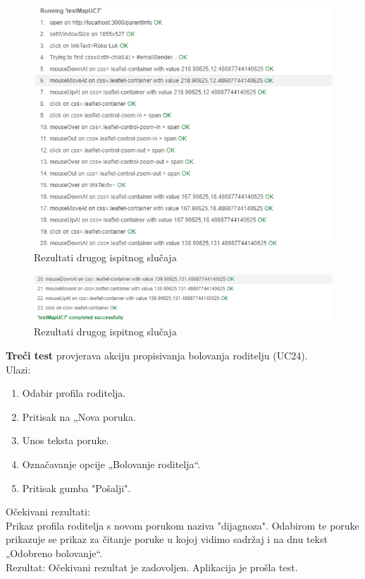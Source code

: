 		\begin{figure}[H]
			\includegraphics[width=\textwidth]{slike/pregledNaručivanja.PNG} %
			\caption{Rezultati drugog ispitnog slučaja}
			\label{fig:pregledKarteTest} %
		\end{figure}
		\begin{figure}[H]
			\includegraphics[width=\textwidth]{slike/pregledNaručivanja2.PNG} %
			\caption{Rezultati drugog ispitnog slučaja}
			\label{fig:pregledKarteTest2} %
		\end{figure}
		
		
		\noindent \textbf{Treći test} provjerava akciju propisivanja bolovanja roditelju (UC24).\\
		Ulazi:
		\begin{enumerate}
			\item Odabir profila roditelja.
			\item Pritisak na „Nova poruka.
			\item Unos teksta poruke.
			\item Označavanje opcije „Bolovanje roditelja“.
			\item Pritisak gumba "Pošalji".
		\end{enumerate}
		Očekivani rezultati:\\Prikaz profila roditelja s novom porukom naziva "dijagnoza". Odabirom te poruke prikazuje se prikaz za čitanje poruke u kojoj vidimo sadržaj i na dnu tekst „Odobreno bolovanje“.\\
		Rezultat: Očekivani rezultat je zadovoljen. Aplikacija je prošla test.
		
